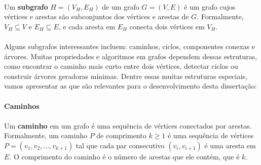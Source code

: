 \documentclass[12pt,a4paper]{article}
\begin{document}
\paragraph{}Um \textbf{subgrafo} \(H = (V_H, E_H)\) de um grafo \(G = (V, E)\) é um grafo cujos vértices e arestas são subconjuntos dos vértices e arestas de \(G\). Formalmente, \(V_H \subseteq V\) e \(E_H \subseteq E\), e cada aresta em \(E_H\) conecta dois vértices em \(V_H\).

\paragraph{}
Alguns subgrafos interessantes incluem: caminhos, ciclos, componentes conexas e árvores. Muitas propriedades e algoritmos em grafos dependem dessas estruturas, como encontrar o caminho mais curto entre dois vértices, detectar ciclos ou construir árvores geradoras mínimas. Dentre essas muitas estruturas especiais, vamos apresentar as que são relevantes para o desenvolvimento desta dissertação:

\paragraph{Caminhos}
\paragraph{}Um \textbf{caminho} em um grafo é uma sequência de vértices conectados por arestas. Formalmente, um caminho \(P\) de comprimento \(k\geq 1\) é uma sequência de vértices \(P = (v_1, v_2, \ldots, v_{k+1})\) tal que cada par consecutivo \((v_i, v_{i+1})\) é uma aresta em \(E\). O comprimento do caminho é o número de arestas que ele contém, que é \(k\).
\end{document}
